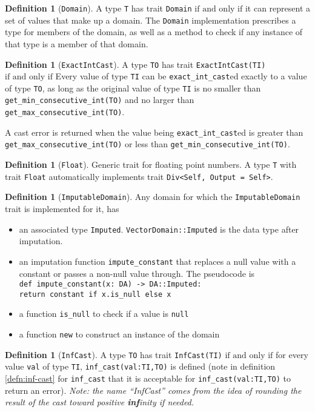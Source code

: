 \documentclass[11pt,a4paper]{article}
\theoremstyle{definition}
\newtheorem{definition}[theorem]{Definition}
\newcommand{\iffText}{\text{if and only if}}
\begin{document}
\begin{definition}[\texttt{Domain}]
\label{defn:traits-domain}
A type \texttt{T} has trait \texttt{Domain} $\iffText$ it can represent a set of values that make up a domain. The \texttt{Domain} implementation prescribes a type for members of the domain, as well as a method to check if any instance of that type is a member of that domain.
\end{definition}
\begin{definition}[\texttt{ExactIntCast}]
    A type \texttt{TO} has trait \texttt{ExactIntCast(TI)} $\iffText$ Every value of type \texttt{TI} can be \texttt{exact\_int\_cast}ed exactly to a value of type \texttt{TO}, as long as the original value of type \texttt{TI} is no smaller than \texttt{get\_min\_consecutive\_int(TO)} and no larger than \texttt{get\_max\_consecutive\_int(TO)}.
    
    A cast error is returned when the value being \texttt{exact\_int\_cast}ed is greater than \texttt{get\_max\_consecutive\_int(TO)} or less than \texttt{get\_min\_consecutive\_int(TO)}.
\end{definition}
\begin{definition}[\texttt{Float}]
    Generic trait for floating point numbers. A type \texttt{T} with trait \texttt{Float} automatically implements trait \texttt{Div<Self, Output = Self>}.
\end{definition}
\begin{definition}[\texttt{ImputableDomain}] 
Any domain for which the \texttt{ImputableDomain} trait is implemented for it, has 
\begin{itemize}
    \item an associated type \texttt{Imputed}. \texttt{VectorDomain::Imputed} is the data type after imputation. 
    \item an imputation function \texttt{impute\_constant} that replaces a null value with a constant or passes a non-null value through. The pseudocode is \\
    \texttt{def impute\_constant(x: DA) -> DA::Imputed: \\ return constant if x.is\_null else x}
    \item  a function \texttt{is\_null} to check if a value is \texttt{null}
    \item a function \texttt{new} to construct an instance of the domain
\end{itemize}
\end{definition}
\begin{definition}[\texttt{InfCast}]
A type \texttt{TO} has trait \texttt{InfCast(TI)} $\iffText$ for every value \texttt{val} of type \texttt{TI}, \texttt{inf\_cast(val:TI,TO)} is defined (note in definition \ref{defn:inf-cast} for \texttt{inf\_cast} that it is acceptable for \texttt{inf\_cast(val:TI,TO)} to return an error).
\emph{Note: the name ``InfCast'' comes from the idea of rounding the result of the cast toward positive \textbf{inf}inity if needed.}
\end{definition}
\end{document}
